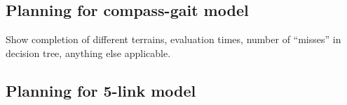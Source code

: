 \subsection{Planning for compass-gait model}
Show completion of different terrains, evaluation times, number of ``misses'' in decision tree, anything else applicable.

\subsection{Planning for 5-link model}